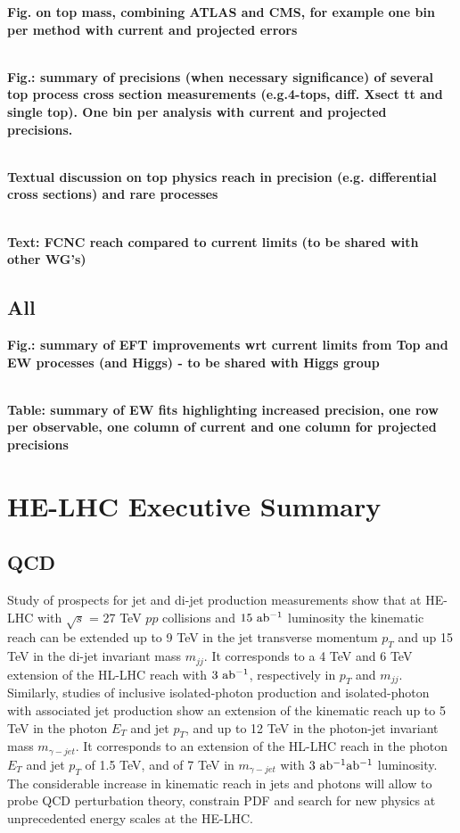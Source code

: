 \documentclass{article}
\begin{document}
{\bf Fig. on top mass, combining ATLAS and CMS, for example one bin per method with current and projected errors}


\\
{\bf Fig.: summary of precisions (when necessary significance) of several top process cross section measurements (e.g.4-tops, diff. Xsect tt and single top). One bin per analysis with current and projected precisions.}


\\
{\bf Textual discussion on top physics reach in precision (e.g. differential cross sections) and rare processes}


\\
{\bf Text: FCNC reach compared to current limits (to be shared with other WG's)}

\subsection{All}


{\bf Fig.: summary of EFT improvements wrt current limits from Top and EW processes (and Higgs) - to be shared with Higgs group}


\\
{\bf Table: summary of EW fits highlighting increased precision, one row per observable, one column of current and one column for projected precisions}



\clearpage
\section{HE-LHC Executive Summary}

\subsection{QCD}

Study of prospects for jet and di-jet production measurements show that at HE-LHC with $\sqrt{s}$ = 27 TeV $pp$ collisions and $15~ {\rm ab^{-1}}$ luminosity the kinematic reach can be extended up to 9 TeV in the jet transverse momentum $p_T$ and up 15 TeV in the di-jet invariant mass $m_{jj}$. It corresponds to a 4 TeV and 6 TeV extension of the HL-LHC reach with $3~ {\rm ab^{-1}}$, respectively in $p_T$ and $m_{jj}$. Similarly, studies of inclusive isolated-photon production and isolated-photon with associated jet production show an extension of the kinematic reach up to 5 TeV in the photon $E_T$ and jet $p_T$, and up to 12 TeV in the photon-jet invariant mass $m_{\gamma - jet}$. It corresponds to an extension of the HL-LHC reach in the photon $E_T$ and jet $p_T$ of 1.5 TeV, and of 7 TeV in $m_{\gamma - jet}$ with $3 ~{\rm ab^{-1}}{\rm ab^{-1}}$ luminosity.
The considerable increase in kinematic reach in jets and photons will allow to probe QCD perturbation theory, constrain PDF and search for new physics at unprecedented energy scales at the HE-LHC.
\end{document}
